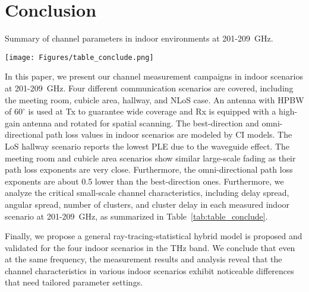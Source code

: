 \documentclass[journal,12pt,draftclsnofoot,onecolumn]{IEEEtran}
\begin{document}
\section{Conclusion} \label{Sec:Conclusion}
\begin{table*}
    \centering
    \caption{Summary of channel parameters in indoor environments at 201-209~GHz.}
    \texttt{[image: Figures/table\_conclude.png]}
    \label{tab:table_conclude}
\end{table*}
In this paper, we present our channel measurement campaigns in indoor scenarios at 201-209~GHz. Four different communication scenarios are covered, including the meeting room, cubicle area, hallway, and NLoS case. An antenna with HPBW of $60^\circ$ is used at Tx to guarantee wide coverage and Rx is equipped with a high-gain antenna and rotated for spatial scanning.
The best-direction and omni-directional path loss values in indoor scenarios are modeled by CI models. The LoS hallway scenario reports the lowest PLE due to the waveguide effect. The meeting room and cubicle area scenarios show similar large-scale fading as their path loss exponents are very close. 
Furthermore, the omni-directional path loss exponents are about 0.5 lower than the best-direction ones. Furthermore, we analyze the critical small-scale channel characteristics, including delay spread, angular spread, number of clusters, and cluster delay in each measured indoor scenario at 201-209~GHz, as summarized in Table~\ref{tab:table_conclude}.
\par Finally, we propose a general ray-tracing-statistical hybrid model is proposed and validated for the four indoor scenarios in the THz band. We conclude that even at the same frequency, the measurement results and analysis reveal that the channel characteristics in various indoor scenarios exhibit noticeable differences that need tailored parameter settings.


\vfill
\end{document}
